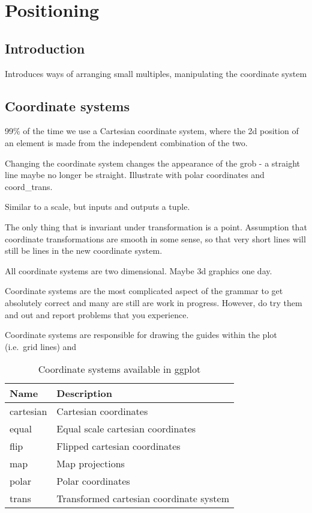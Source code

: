 
\chapter{Positioning}
\label{cha:position}

\section{Introduction}

Introduces ways of arranging small multiples, manipulating the coordinate system


\section{Coordinate systems}
\label{sec:coord}

99\% of the time we use a Cartesian coordinate system, where the 2d position of an element is made from the independent combination of the two.

Changing the coordinate system changes the appearance of the grob - a straight line maybe no longer be straight.  Illustrate with polar coordinates and coord\_trans.  

Similar to a scale, but inputs and outputs a tuple.

The only thing that is invariant under transformation is a point.  Assumption that coordinate transformations are smooth in some sense, so that very short lines will still be lines in the new coordinate system.

All coordinate systems are two dimensional.  Maybe 3d graphics one day.

Coordinate systems are the most complicated aspect of the grammar to get absolutely correct and many are still are work in progress.  However, do try them and out and report problems that you experience.


Coordinate systems are responsible for drawing the guides within the plot (i.e.\ grid lines) and 

\begin{table}
  \begin{center}
  \begin{tabular}{ll}
    \toprule
    Name      & Description  \\
    \midrule
    cartesian & Cartesian coordinates                  \\
    equal     & Equal scale cartesian coordinates      \\
    flip      & Flipped cartesian coordinates          \\
    map       & Map projections                        \\
    polar     & Polar coordinates                      \\
    trans     & Transformed cartesian coordinate system\\
    \bottomrule
    
  \end{tabular}
  \end{center}
  \caption{Coordinate systems available in ggplot}
  \label{tbl:coord}
\end{table}

